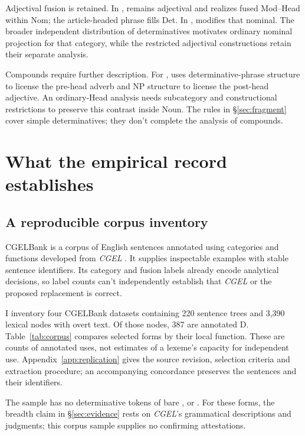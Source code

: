 \documentclass[12pt]{article}
\begin{document}
Adjectival fusion is retained. In ,  remains adjectival and realizes fused Mod--Head within Nom; the article-headed phrase fills Det. In ,  modifies that nominal. The broader independent distribution of determinatives motivates ordinary nominal projection for that category, while the restricted adjectival constructions retain their separate analysis.

Compounds require further description. For , \textcite{Payne2007} uses determinative-phrase structure to license the pre-head adverb and NP structure to license the post-head adjective. An ordinary-Head analysis needs subcategory and constructional restrictions to preserve this contrast inside Noun. The rules in §\ref{sec:fragment} cover simple determinatives; they don't complete the analysis of compounds.

\section{What the empirical record establishes}\label{sec:empirical}

\subsection{A reproducible corpus inventory}

CGELBank is a corpus of English sentences annotated using categories and functions developed from \textit{CGEL} \citep{reynolds2023unified}. It supplies inspectable examples with stable sentence identifiers. Its category and fusion labels already encode analytical decisions, so label counts can't independently establish that \textit{CGEL} or the proposed replacement is correct.

I inventory four CGELBank datasets containing 220 sentence trees and 3,390 lexical nodes with overt text. Of those nodes, 387 are annotated D. Table~\ref{tab:corpus} compares selected forms by their local function. These are counts of annotated uses, not estimates of a lexeme's capacity for independent use. Appendix~\ref{app:replication} gives the source revision, selection criteria and extraction procedure; an accompanying concordance preserves the sentences and their identifiers.

The sample has no determinative tokens of bare ,  or . For these forms, the breadth claim in §\ref{sec:evidence} rests on \textit{CGEL}'s grammatical descriptions and judgments; this corpus sample supplies no confirming attestations.
\end{document}
